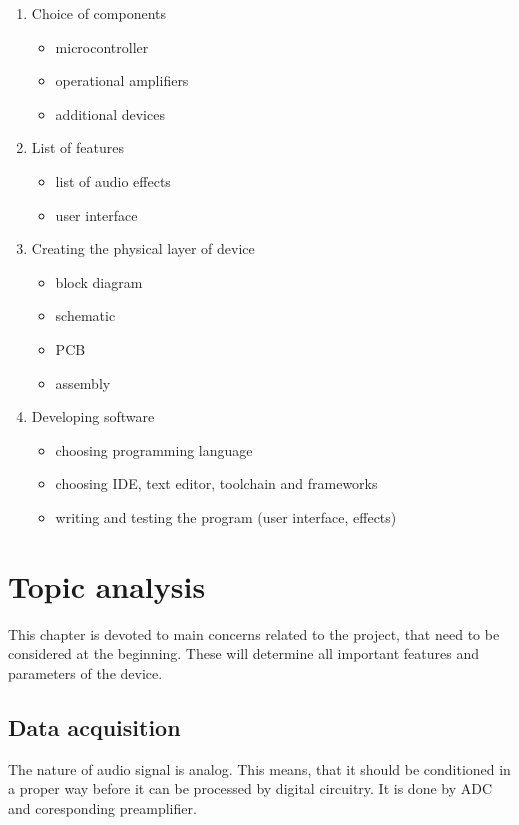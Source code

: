 \documentclass[a4paper,twoside,12pt]{book}
\begin{document}
\begin{enumerate}
    \item Choice of components
    \begin{itemize}
        \item microcontroller
        \item operational amplifiers
        \item additional devices
    \end{itemize}

    \item List of features
    \begin{itemize}
        \item list of audio effects
        \item user interface
    \end{itemize}

    \item Creating the physical layer of device
    \begin{itemize}
        \item block diagram
        \item schematic
        \item PCB
        \item assembly 
    \end{itemize}

    \item Developing software
    \begin{itemize}
        \item choosing programming language
        \item choosing IDE, text editor, toolchain and frameworks
        \item writing and testing the program (user interface, effects)
    \end{itemize}
\end{enumerate}




\chapter{Topic analysis}
This chapter is devoted to main concerns related to the project,
that need to be considered at the beginning.
These will determine all important features and parameters of the device.

\section{Data acquisition}
The nature of audio signal is analog. This means,
that it should be conditioned in a proper way before it can be processed by digital circuitry.
It is done by ADC and coresponding preamplifier.
\end{document}
